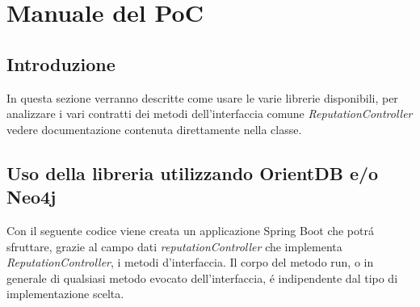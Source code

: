\section{Manuale del PoC}
\subsection{Introduzione}
In questa sezione verranno descritte come usare le varie librerie disponibili, per analizzare i vari contratti dei metodi dell'interfaccia comune \textit{ReputationController} vedere documentazione contenuta direttamente nella classe.




\subsection{Uso della libreria utilizzando OrientDB e/o Neo4j}
Con il seguente codice viene creata un applicazione Spring Boot che potr\'a sfruttare, grazie al campo dati \textit{reputationController} che implementa \textit{ReputationController}, i metodi d'interfaccia. Il corpo del metodo run, o in generale di qualsiasi metodo evocato dell'interfaccia, \'e indipendente dal tipo di implementazione scelta.
